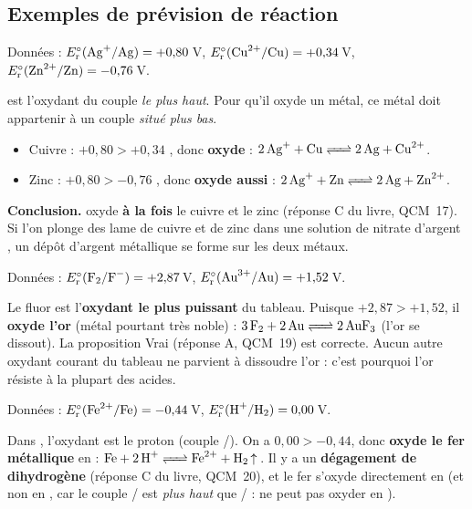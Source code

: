 \documentclass[11pt,a4paper]{article}
\newcommand{\degner}[1]{\ensuremath{E_{\mathrm{r}}^{\circ}(#1)}}  %
\begin{document}
\subsection{Exemples de prévision de réaction}

\begin{exemple}
Données : $\degner{\ce{Ag+}/\ce{Ag}}=+0{,}80$\,V, $\degner{\ce{Cu^{2+}}/\ce{Cu}}=+0{,}34$\,V,
$\degner{\ce{Zn^{2+}}/\ce{Zn}}=-0{,}76$\,V.

 est l'oxydant du couple \emph{le plus haut}. Pour qu'il oxyde un métal, ce métal doit
appartenir à un couple \emph{situé plus bas}.
\begin{itemize}[leftmargin=1.6em,topsep=1pt,itemsep=2pt]
  \item Cuivre : $+0{,}80>+0{,}34$ \checkmark, donc  \textbf{oxyde}  :
        $\ce{2 Ag+ + Cu <=> 2 Ag + Cu^{2+}}$.
  \item Zinc : $+0{,}80>-0{,}76$ \checkmark, donc  \textbf{oxyde aussi}  :
        $\ce{2 Ag+ + Zn <=> 2 Ag + Zn^{2+}}$.
\end{itemize}
\textbf{Conclusion.}  oxyde \textbf{à la fois} le cuivre et le zinc (réponse C du livre,
QCM~17). Si l'on plonge des lame de cuivre et de zinc dans une solution de nitrate d'argent
, un dépôt d'argent métallique se forme sur les deux métaux.
\end{exemple}

\begin{exemple}
Données : $\degner{\ce{F2}/\ce{F^-}}=+2{,}87$\,V, $\degner{\ce{Au^{3+}}/\ce{Au}}=+1{,}52$\,V.

Le fluor  est l'\textbf{oxydant le plus puissant} du tableau. Puisque $+2{,}87>+1{,}52$,
il \textbf{oxyde l'or} (métal pourtant très noble) :
$\ce{3 F2 + 2 Au <=> 2 AuF3}$ (l'or se dissout). La proposition \og Vrai\fg{} (réponse A, QCM~19)
est correcte. Aucun autre oxydant courant du tableau ne parvient à dissoudre l'or : c'est pourquoi
l'or résiste à la plupart des acides.
\end{exemple}

\begin{exemple}
Données : $\degner{\ce{Fe^{2+}}/\ce{Fe}}=-0{,}44$\,V, $\degner{\ce{H+}/\ce{H2}}=0{,}00$\,V.

Dans , l'oxydant est le proton  (couple /). On a $0{,}00>-0{,}44$,
donc  \textbf{oxyde le fer métallique} en  :
$\ce{Fe + 2 H+ <=> Fe^{2+} + H2 ^}$. Il y a un \textbf{dégagement de dihydrogène} 
(réponse C du livre, QCM~20), et le fer s'oxyde directement en  (et non en ,
car le couple / est \emph{plus haut} que / :  ne peut
pas oxyder  en ).
\end{exemple}
\end{document}
